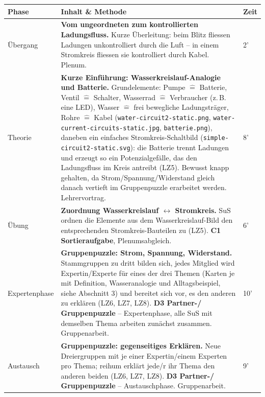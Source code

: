 \documentclass[11pt,a4paper]{article}
\newcommand{\Methode}[1]{{\small\color{groupteal}\textbf{#1}}}
\begin{document}
\begin{xltabular}{\textwidth}{@{}p{2.6cm}X p{1.2cm}@{}}
\toprule
\textbf{Phase} & \textbf{Inhalt \& Methode} & \textbf{Zeit} \\
\midrule
\endhead

Übergang &
\textbf{Vom ungeordneten zum kontrollierten Ladungsfluss.} Kurze
Überleitung: beim Blitz fliessen Ladungen unkontrolliert durch die Luft --
in einem Stromkreis fliessen sie kontrolliert durch Kabel. Plenum. &
2' \\[0.4em]

Theorie &
\textbf{Kurze Einführung: Wasserkreislauf-Analogie und Batterie.}
Grundelemente: Pumpe $\hat=$ Batterie, Ventil $\hat=$ Schalter, Wasserrad
$\hat=$ Verbraucher (z.\,B. eine LED), Wasser $\hat=$ frei bewegliche
Ladungsträger, Rohre $\hat=$ Kabel (\texttt{water-circuit2-static.png},
\texttt{water-current-circuits-static.jpg}, \texttt{batterie.png}),
daneben ein einfaches Stromkreis-Schaltbild
(\texttt{simple-circuit2-static.svg}): die Batterie trennt Ladungen und
erzeugt so ein Potenzialgefälle, das den Ladungsfluss im Kreis antreibt
(LZ5). Bewusst knapp gehalten, da Strom/Spannung/Widerstand gleich danach
vertieft im Gruppenpuzzle erarbeitet werden. Lehrervortrag. &
8' \\[0.4em]

Übung &
\textbf{Zuordnung Wasserkreislauf $\leftrightarrow$ Stromkreis.} SuS
ordnen die Elemente aus dem Wasserkreislauf-Bild den entsprechenden
Stromkreis-Bauteilen zu (LZ5). \Methode{C1 Sortieraufgabe},
Plenumsabgleich. &
6' \\[0.4em]

Expertenphase &
\textbf{Gruppenpuzzle: Strom, Spannung, Widerstand.} Stammgruppen zu
dritt bilden sich, jedes Mitglied wird Expertin/Experte für eines der
drei Themen (Karten je mit Definition, Wasseranalogie und
Alltagsbeispiel, siehe Abschnitt 3) und bereitet sich vor, es den
anderen zu erklären (LZ6, LZ7, LZ8). \Methode{D3 Partner-/
Gruppenpuzzle} -- Expertenphase, alle SuS mit demselben Thema arbeiten
zunächst zusammen. Gruppenarbeit. &
10' \\[0.4em]

Austausch &
\textbf{Gruppenpuzzle: gegenseitiges Erklären.} Neue Dreiergruppen mit
je einer Expertin/einem Experten pro Thema; reihum erklärt jede/r ihr
Thema den anderen beiden (LZ6, LZ7, LZ8). \Methode{D3 Partner-/
Gruppenpuzzle} -- Austauschphase. Gruppenarbeit. &
9' \\[0.4em]


\end{xltabular}
\end{document}
